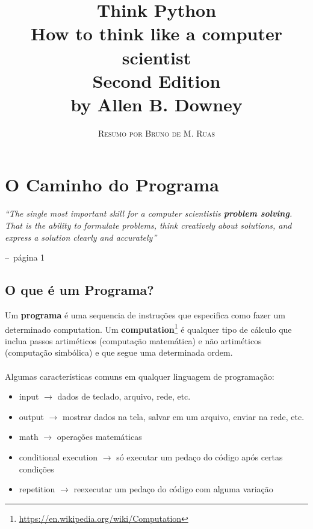 \documentclass[a4paper,11pt]{book}
\title{\Huge \textbf{Think Python} \\ 
\Large How to think like a computer scientist \\
\large Second Edition \\
\huge by Allen B. Downey}
\author{\textsc{Resumo por Bruno de M. Ruas}}
\makeatletter
\newenvironment{chapquote}[2][2em]
  {\setlength{\@tempdima}{#1}%
   \def\chapquote@author{#2}%
   \parshape 1 \@tempdima \dimexpr\textwidth-2\@tempdima\relax%
   \itshape}
  {\par\normalfont\hfill--\ \chapquote@author\hspace*{\@tempdima}\par\bigskip}
\makeatother
\begin{document}
\frontmatter
\maketitle

\tableofcontents

\mainmatter

\chapter{O Caminho do Programa}

\begin{chapquote}{página 1}
	``The single most important skill for a computer scientistis \textbf{problem solving}. That is the 
	ability to formulate problems, think creatively about solutions, and express a solution clearly and 
	accurately''
\end{chapquote}

\section{O que é um Programa?}
Um \textbf{programa} é uma sequencia de instruções que especifica como fazer um determinado computation. Um \textbf{computation}\footnote{\href{https://en.wikipedia.org/wiki/Computation}{https://en.wikipedia.org/wiki/Computation}} é qualquer tipo de cálculo que inclua 
passos artiméticos (computação matemática) e não artiméticos (computação simbólica) e que segue uma determinada ordem.
\\
\\
Algumas características comuns em qualquer linguagem de programação:
\begin{itemize}
	\item input $\rightarrow$ dados de teclado, arquivo, rede, etc.
	\item output $\rightarrow$ mostrar dados na tela, salvar em um arquivo, enviar na rede, etc.
	\item math $\rightarrow$ operações matemáticas
	\item conditional execution $\rightarrow$ só executar um pedaço do código após certas condições
	\item repetition $\rightarrow$ reexecutar um pedaço do código com alguma variação
\end{itemize}
\end{document}

